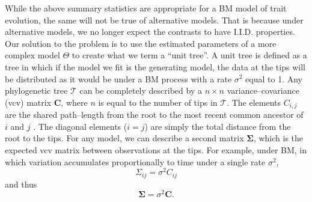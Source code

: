 \documentclass[12pt]{article}
\begin{document}
While the above summary statistics are appropriate for a BM model of trait evolution, the same will not be true of alternative models. That is because under alternative models, we no longer expect the contrasts to have I.I.D. properties. Our solution to the problem is to use the estimated parameters of a more complex model $\Theta$ to create what we term a ``unit tree''. A unit tree is defined as a tree in which if the model we fit is the generating model, the data at the tips will be distributed as it would be under a BM process with a rate $\sigma^2$ equal to 1. Any phylogenetic tree $\mathcal{T}$ can be completely described by a $n \times n$ variance--covariance (vcv) matrix $\mathbf{C}$, where $n$ is equal to the number of tips in $\mathcal{T}$. The elements $C_{i,j}$ are the shared path--length from the root to the most recent common ancestor of $i$ and $j$ \citep{Piazza1975}. The diagonal elements ($i = j$) are simply the total distance from the root to the tips. For any model, we can describe a second matrix $\mathbf{\Sigma}$, which is the expected vcv matrix between observations at the tips. For example, under BM, in which variation accumulates proportionally to time under a single rate $\sigma^2$,
\begin{equation}
\Sigma_{ij} = \sigma^2 C_{ij}
\end{equation}
and thus
\begin{equation}
\mathbf{\Sigma} = \sigma^2 \mathbf{C}.
\end{equation}
\end{document}
